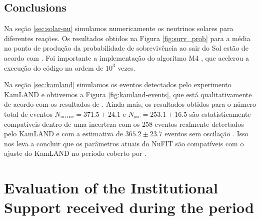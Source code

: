 \documentclass[12pt]{report}
\begin{document}
%
%
%

\section{Conclusions}

Na seção \ref{sec:solar-nu} simulamos numericamente os neutrinos solares para diferentes reações. Os resultados obtidos na Figura \ref{fig:surv_prob} para a média no ponto de produção da probabilidade de sobrevivência ao sair do Sol estão de acordo com \cite{winslow}. Foi importante a implementação do algoritmo M4 \cite{efficient-nu}, que acelerou a execução do código na ordem de $10^3$ vezes.


Na seção \ref{sec:kamland} simulamos os eventos detectados pelo experimento KamLAND e obtivemos a Figura \ref{fig:kamland-events}, que está qualitativamente de acordo com os resultados de \cite{spectral-distortion}. Ainda mais, os resultados obtidos para o número total de eventos $N_{\text{no-osc}} = 371.5 \pm 24.1$ e $N_{\text{osc}} = 253.1 \pm 16.5$ são estatisticamente compatíveis dentro de uma incerteza com os 258 eventos realmente detectados pelo KamLAND e com a estimativa de $365.2 \pm 23.7$ eventos sem oscilação \cite{spectral-distortion}. Isso nos leva a concluir que os parâmetros atuais do NuFIT \cite{nufit} são compatíveis com o ajuste do KamLAND no período coberto por \cite{spectral-distortion}.


\chapter{Evaluation of the Institutional Support received during the period} \label{chp:apoioInst}
\end{document}
